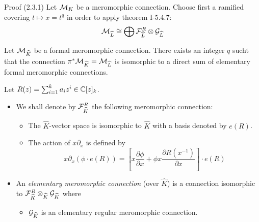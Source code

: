 \begin{frame}[t]{Proof (2.3.1)}
  Let $\mathcal{M}_K$ be a meromorphic connection. Choose first a ramified covering
  $t\mapsto x=t^q$ in order to apply theorem I-5.4.7:
  \[
    \mathcal{M}_{\widehat L}\cong\bigoplus\mathcal{F}_{\widehat L}^R\otimes\mathcal{G}_{\widehat L}
  \]
  \begin{thm}[I-5.4.7]
    Let $\mathcal{M}_{\widehat K}$ be a formal meromorphic connection. There exists an
    integer $q$ sucht that the connection $\pi^*\mathcal{M}_{\widehat K}=\mathcal{M}_{\widehat L}$ is
    isomorphic to a direct sum of elementary formal meromorphic connections.
    \begin{defn}[5.4.4 + 5.4.5]
      Let $R(z)=\sum_{i=1}^ka_iz^i\in\mathbb{C}[z]_k$.
      \begin{itemize}
        \item We shall denote by $\mathcal{F}_{\widehat K}^R$ the following meromorphic
          connection:
          \begin{itemize}
            \item The $\hat K$-vector space is isomorphic to $\hat K$ with a
              basis denoted by $e(R)$.
            \item
              The action of $x\partial_x$ is defined
              by
              \[
                x\partial_x(\phi\cdot e(R))=\left[
                  x\frac{\partial\phi}{\partial x}
                  +\phi x\frac{\partial R(x^{-1})}{\partial x}
                \right]\cdot e(R)
              \]
          \end{itemize}
        \item An \emph{elementary meromorphic connection} (over $\hat K$) is a
          connection isomorphic to $\mathcal{F}_{\widehat K}^R\otimes_{\widehat K}\mathcal{G}_{\widehat K}$
          where
          \begin{itemize}
            \item $\mathcal{G}_{\widehat K}$ is an elementary regular meromorphic
              connection.
          \end{itemize}
      \end{itemize}
    \end{defn}
  \end{thm}
\end{frame}


